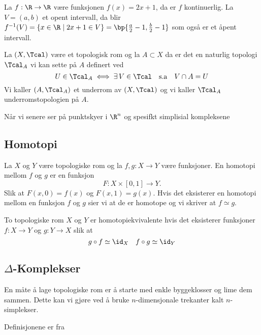 \begin{example}\label{Ex:KontFunk}
    La $f: \R\to \R$ være funksjonen $f(x)=2x+1$, da er $f$ kontinuerlig. La $V = (a,b)$ et opent intervall, da blir $f^{-1}(V) = \{x\in\R\;|\;2x+1\in V\}=\bp{\frac{a}{2}-1,\frac{b}{2}-1}$ som også er et åpent intervall.
\end{example}

\begin{definition}\label{Def:UnderTop}
    La $(X,\Tcal)$ være et topologisk rom og la $A\subset X$ da er det en naturlig topologi $\Tcal_A$ vi kan sette på $A$ definert ved
    \[U\in\Tcal_A \iff \exists\, V\in\Tcal\quad\text{s.a}\quad V\cap A = U\]
    Vi kaller $(A,\Tcal_A)$ et underrom av $(X,\Tcal)$ og vi kaller $\Tcal_A$ underromstopologien på $A$.
\end{definition}

Når vi senere ser på punktskyer i $\R^n$ og spesifkt simplisial kompleksene %

\subsection{Homotopi}\label{sec:Homotopi}
\begin{definition}\label{Def:Homotopi}
    La $X$ og $Y$ være topologiske rom og la $f,g: X\to Y$ være funksjoner. En homotopi mellom $f$ og $g$ er en funksjon
    \[F: X\times[0,1]\to Y.\]
    Slik at $F(x,0)=f(x)$ og $F(x,1)=g(x)$.
    Hvis det eksisterer en homotopi mellom en funksjon $f$ og $g$ sier vi at de er homotope og vi skriver at $f\simeq g$.
\end{definition}

\begin{definition}\label{Def:HomotopiEkv}
    To topologiske rom $X$ og $Y$ er homotopiekvivalente hvis det eksisterer funksjoner $f: X\to Y$ og $g: Y\to X$ slik at
    \[g\circ f\simeq\id_X\quad f\circ g \simeq \id_Y\]
\end{definition}



\subsection{$\Delta$-Komplekser}\label{sec:SimpKomp}
En måte å lage topologiske rom er å starte med enkle byggeklosser og lime dem sammen. Dette kan vi gjøre ved å bruke $n$-dimensjonale trekanter kalt $n$-simplekser.

Definisjonene er fra \cite{Hatcher2002}

